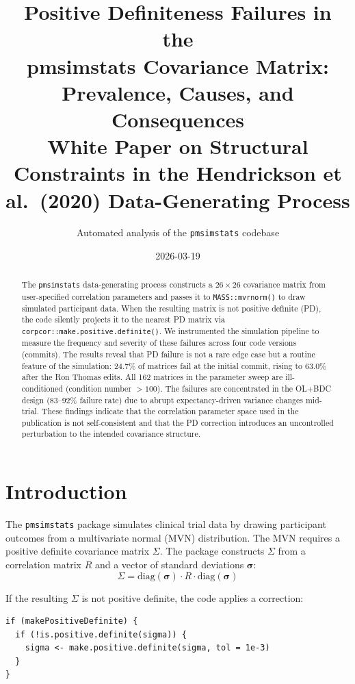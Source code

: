 \documentclass[11pt]{article}
\title{Positive Definiteness Failures in the\\
       pmsimstats Covariance Matrix:\\
       Prevalence, Causes, and Consequences\\[6pt]
       \large White Paper on Structural Constraints in the
       Hendrickson et al.\ (2020) Data-Generating Process}
\author{Automated analysis of the \texttt{pmsimstats} codebase}
\date{2026-03-19}
\begin{document}
\maketitle
\thispagestyle{fancy}

\begin{abstract}
The \texttt{pmsimstats} data-generating process constructs a
$26 \times 26$ covariance matrix from user-specified correlation
parameters and passes it to \texttt{MASS::mvrnorm()} to draw
simulated participant data. When the resulting matrix is not
positive definite (PD), the code silently projects it to the
nearest PD matrix via
\texttt{corpcor::make.positive.definite()}. We instrumented the
simulation pipeline to measure the frequency and severity of
these failures across four code versions (commits). The results
reveal that PD failure is not a rare edge case but a routine
feature of the simulation: 24.7\% of matrices fail at the
initial commit, rising to 63.0\% after the Ron Thomas edits.
All 162 matrices in the parameter sweep are ill-conditioned
(condition number $> 100$). The failures are concentrated in the
OL+BDC design (83--92\% failure rate) due to abrupt
expectancy-driven variance changes mid-trial. These findings
indicate that the correlation parameter space used in the
publication is not self-consistent and that the PD correction
introduces an uncontrolled perturbation to the intended
covariance structure.
\end{abstract}

\tableofcontents
\newpage

\section{Introduction}

The \texttt{pmsimstats} package simulates clinical trial data by
drawing participant outcomes from a multivariate normal (MVN)
distribution. The MVN requires a positive definite covariance
matrix $\Sigma$. The package constructs $\Sigma$ from a
correlation matrix $R$ and a vector of standard deviations
$\boldsymbol{\sigma}$:
\[
\Sigma = \text{diag}(\boldsymbol{\sigma})
  \cdot R \cdot
  \text{diag}(\boldsymbol{\sigma})
\]

If the resulting $\Sigma$ is not positive definite, the code
applies a correction:

\begin{verbatim}
if (makePositiveDefinite) {
  if (!is.positive.definite(sigma)) {
    sigma <- make.positive.definite(sigma, tol = 1e-3)
  }
}
\end{verbatim}
\end{document}

